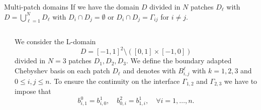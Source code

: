 \documentclass{beamer}
\begin{document}
\begin{frame}{Multi-patch domains}
	If we have the domain $D$ divided in $N$ patches $D_\ell$ with $D = \bigcup_{\ell=1}^{N} D_\ell$ with $D_i \cap D_j = \emptyset$ or $D_i \cap D_j = \Gamma_{ij}$ for $i \neq j$.
	\begin{columns}
		\begin{column}{0.3\textwidth}
			\begin{center}
			\end{center}
		\end{column}%
		\begin{column}{0.7\textwidth}
			We consider the L-domain 
			\[ D = [-1, 1]^2\setminus ([0,1]\times [-1,0]) \]
			divided in $N=3$ patches $ D_1, D_2, D_3 $.
			We define the boundary adapted Chebyshev basis on each patch $D_\ell$ and denotes with $B_{i,j}^{\ell}$ with $k=1,2,3$ and $0 \le i,j \le n$. To ensure the continuity on the interface $\Gamma_{1,2}$ and $\Gamma_{2,3}$ we have to impose that
			\[ b^{0}_{i, 1} = b^{1}_{i,0}, \quad b^{2}_{0,i} = b^{1}_{1, i}, \quad \forall i = 1, \dots, n.\]
		\end{column}
	\end{columns}
\end{frame}

\end{document}
